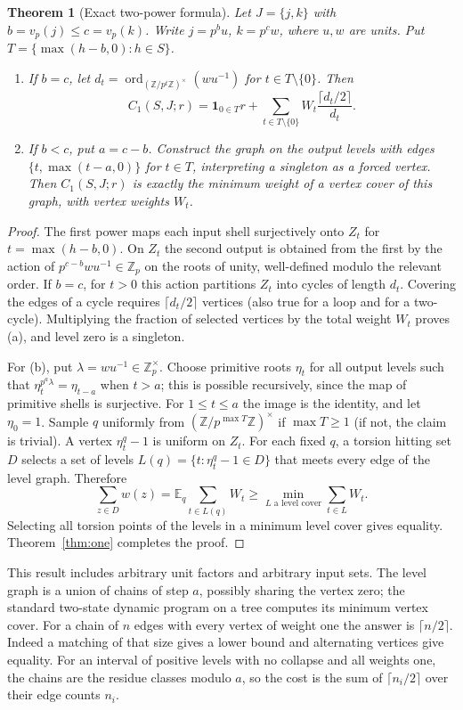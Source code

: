 \documentclass[11pt]{article}
\newtheorem{theorem}{Theorem}[section]
\theoremstyle{definition}
\newcommand{\Z}{\mathbb Z}
\newcommand{\ord}{\operatorname{ord}}
\begin{document}
\begin{theorem}[Exact two-power formula]\label{thm:pair}
Let $J=\{j,k\}$ with $b=v_p(j)\le c=v_p(k)$. Write $j=p^b u$, $k=p^c w$, where $u,w$ are units. Put $T=\{\max(h-b,0):h\in S\}$.
\begin{enumerate}[label=(\alph*),leftmargin=*]
\item If $b=c$, let $d_t=\ord_{(\Z/p^t\Z)^\times}(wu^{-1})$ for $t\in T\setminus\{0\}$. Then
\[
 C_1(S,J;r)=\mathbf1_{0\in T}r+\sum_{t\in T\setminus\{0\}} W_t\frac{\lceil d_t/2\rceil}{d_t}.
\]
\item If $b<c$, put $a=c-b$. Construct the graph on the output levels with edges $\{t,\max(t-a,0)\}$ for $t\in T$, interpreting a singleton as a forced vertex. Then $C_1(S,J;r)$ is exactly the minimum weight of a vertex cover of this graph, with vertex weights $W_t$.
\end{enumerate}
\end{theorem}
\begin{proof}
The first power maps each input shell surjectively onto $Z_t$ for $t=\max(h-b,0)$. On $Z_t$ the second output is obtained from the first by the action of $p^{c-b}wu^{-1}\in\Z_p$ on the roots of unity, well-defined modulo the relevant order. If $b=c$, for $t>0$ this action partitions $Z_t$ into cycles of length $d_t$. Covering the edges of a cycle requires $\lceil d_t/2\rceil$ vertices (also true for a loop and for a two-cycle). Multiplying the fraction of selected vertices by the total weight $W_t$ proves (a), and level zero is a singleton.

For (b), put $\lambda=wu^{-1}\in\Z_p^\times$. Choose primitive roots $\eta_t$ for all output levels such that $\eta_t^{p^a\lambda}=\eta_{t-a}$ when $t>a$; this is possible recursively, since the map of primitive shells is surjective. For $1\le t\le a$ the image is the identity, and let $\eta_0=1$. Sample $q$ uniformly from $(\Z/p^{\max T}\Z)^\times$ if $\max T\ge1$ (if not, the claim is trivial). A vertex $\eta_t^q-1$ is uniform on $Z_t$. For each fixed $q$, a torsion hitting set $D$ selects a set of levels $L(q)=\{t:\eta_t^q-1\in D\}$ that meets every edge of the level graph. Therefore
\[
 \sum_{z\in D}w(z)=\mathbb E_q\sum_{t\in L(q)}W_t
 \ge\min_{L\text{ a level cover}}\sum_{t\in L}W_t.
\]
Selecting all torsion points of the levels in a minimum level cover gives equality. Theorem~\ref{thm:one} completes the proof.
\end{proof}

This result includes arbitrary unit factors and arbitrary input sets. The level graph is a union of chains of step $a$, possibly sharing the vertex zero; the standard two-state dynamic program on a tree computes its minimum vertex cover. For a chain of $n$ edges with every vertex of weight one the answer is $\lceil n/2\rceil$. Indeed a matching of that size gives a lower bound and alternating vertices give equality. For an interval of positive levels with no collapse and all weights one, the chains are the residue classes modulo $a$, so the cost is the sum of $\lceil n_i/2\rceil$ over their edge counts $n_i$.
\end{document}
